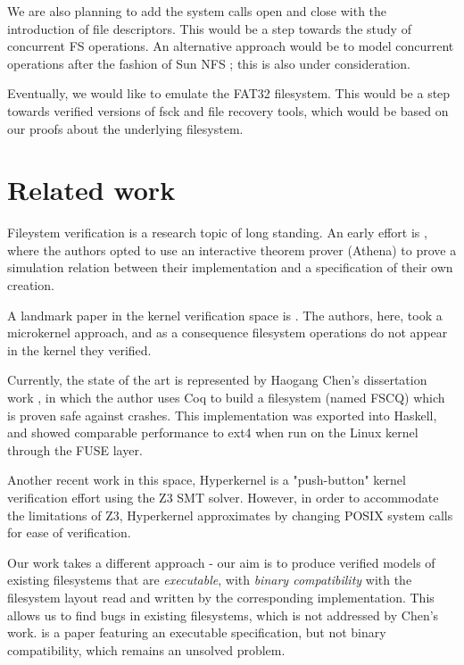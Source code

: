 \documentclass[format=sigconf,review=true]{acmart}
\begin{document}
We are also planning to add the system calls open and close with the
introduction of file descriptors. This would be a step towards the
study of concurrent FS operations. An alternative approach would be to
model concurrent operations after the fashion of Sun NFS
\cite{sandberg1985design}; this is also under consideration.

Eventually, we would like to emulate the FAT32 filesystem. This would
be a step towards verified versions of fsck and file recovery tools,
which would be based on our proofs about the underlying filesystem.

\section{Related work}
Fileystem verification is a research topic of long standing. An early
effort is \cite{arkoudas2004verifying}, where the authors opted to use
an interactive theorem prover (Athena) to prove a simulation relation
between their implementation and a specification of their own
creation.

A landmark paper in the kernel verification space is
\cite{klein2009sel4}. The authors, here, took a microkernel approach,
and as a consequence filesystem operations do not appear in the kernel
they verified.

Currently, the state of the art is represented by Haogang
Chen's dissertation work \cite{DBLP:conf/usenix/ChenZCCKZ16}, in which
the author uses Coq to build a filesystem (named FSCQ) which is proven
safe against crashes. This implementation was exported into Haskell,
and showed comparable performance to ext4 when run on the Linux kernel
through the FUSE layer.

Another recent work in this space, Hyperkernel
\cite{Nelson:2017:HPV:3132747.3132748} is a "push-button" kernel verification
effort using the Z3 SMT solver. However, in order to accommodate the
limitations of Z3, Hyperkernel approximates by changing POSIX system
calls for ease of verification.

Our work takes a different approach - our aim is to produce verified
models of existing filesystems that are \textit{executable}, with
\textit{binary compatibility} with the filesystem layout read and
written by the corresponding implementation. This allows us to find
bugs in existing filesystems, which is not addressed by Chen's
work. \cite{ridge2015sibylfs} is a paper featuring an executable
specification, but not binary compatibility, which remains an unsolved
problem.
\end{document}
